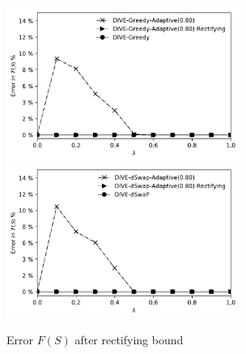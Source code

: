 \documentclass{article}
\begin{document}

\begin{figure}
	\begin{center}
		\vspace{-15pt}
		\includegraphics[width=3.0in]{figures/rectifiying_error_f_s_greedy}
		\includegraphics[width=3.0in]{figures/rectifiying_error_f_s_dswap}
		\caption{Error $F(S)$ after rectifying bound}
		\label{fig:error_fs_adaptive}
	\end{center}
\end{figure}
\end{document}

